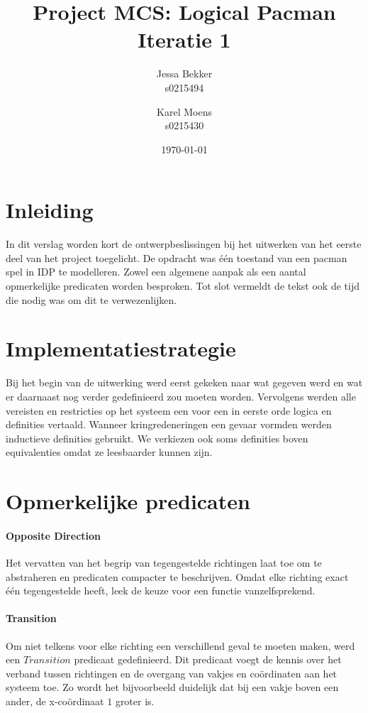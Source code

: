 \documentclass[a4paper,12pt]{article}
\title{Project MCS: Logical Pacman \\ Iteratie 1}
\author{Jessa Bekker\\s0215494 \and Karel Moens \\ s0215430 }
\date{\today}
\begin{document}
\maketitle


\section{Inleiding}
In dit verslag worden kort de ontwerpbeslissingen bij het uitwerken van het eerste deel van het project toegelicht.
De opdracht was \'e\'en toestand van een pacman spel in IDP te modelleren. 
Zowel een algemene aanpak als een aantal opmerkelijke predicaten worden besproken.
Tot slot vermeldt de tekst ook de tijd die nodig was om dit te verwezenlijken.

\section{Implementatiestrategie}
Bij het begin van de uitwerking werd eerst gekeken naar wat gegeven werd en wat er daarnaast nog verder gedefinieerd zou moeten worden.
Vervolgens werden alle vereisten en restricties op het systeem een voor een in eerste orde logica en definities vertaald.
Wanneer kringredeneringen een gevaar vormden werden inductieve definities gebruikt. We verkiezen ook soms definities boven equivalenties omdat ze leesbaarder kunnen zijn.

\section{Opmerkelijke predicaten}

\paragraph{Opposite Direction}
Het vervatten van het begrip van tegengestelde \newline richtingen laat toe om te abstraheren en predicaten compacter te beschrijven. Omdat elke richting exact \'e\'en tegengestelde heeft, leek de keuze voor een functie vanzelfsprekend. 

\paragraph{Transition}
Om niet telkens voor elke richting een verschillend geval te moeten maken, werd een $Transition$ predicaat gedefinieerd.
Dit predicaat voegt de kennis over het verband tussen richtingen en de overgang van vakjes en co\"ordinaten aan het systeem toe.
Zo wordt het bijvoorbeeld duidelijk dat bij een vakje boven een ander, de x-co\"ordinaat $1$ groter is.
\end{document}

